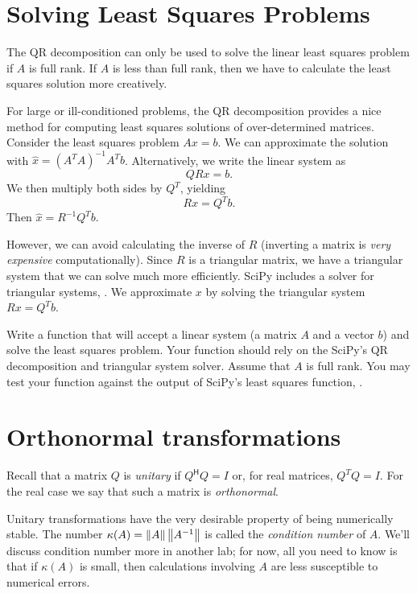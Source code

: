 \section*{Solving Least Squares Problems}
The QR decomposition can only be used to solve the linear least squares problem if $A$ is full rank. If $A$ is less than full rank, then we have to calculate the least squares solution more creatively.



For large or ill-conditioned problems, the QR decomposition provides a nice method for computing least squares solutions of over-determined matrices.
Consider the least squares problem $Ax=b$. We can approximate the solution with $\widehat x = (A^T A)^{-1}A^T b$.
Alternatively, we write the linear system as
\[ Q R x = b. \]
We then multiply both sides by $Q^T$, yielding
\[ R x = Q^T b. \]
Then $\widehat x = R^{-1} Q^T b$.

However, we can avoid calculating the inverse of $R$ (inverting a matrix is \emph{very expensive} computationally).
Since $R$ is a triangular matrix, we have a triangular system that we can solve much more efficiently.
SciPy includes a solver for triangular systems, .
We approximate $x$ by solving the triangular system $Rx = Q^T b$.

\begin{problem}
Write a function  that will accept a linear system (a matrix $A$ and a vector $b$) and solve the least squares problem.
Your function should rely on the SciPy's QR decomposition and triangular system solver.  Assume that $A$ is full rank.
You may test your function against the output of SciPy's least squares function, .
\end{problem}

\section*{Orthonormal transformations}
Recall that a matrix $Q$ is \emph{unitary} if $Q^\mathsf{H} Q = I$ or, for real matrices, $Q^T Q = I$.
For the real case we say that such a matrix is \emph{orthonormal}.

Unitary transformations have the very desirable property of being numerically stable. The number $\kappa(A) = \left\lVert A\right\rVert \left\lVert A^{-1}\right\rVert$ is called the \emph{condition number} of $A$. We'll discuss condition number more in another lab; for now, all you need to know is that if $\kappa(A)$ is small, then calculations involving $A$ are less susceptible to numerical errors.


